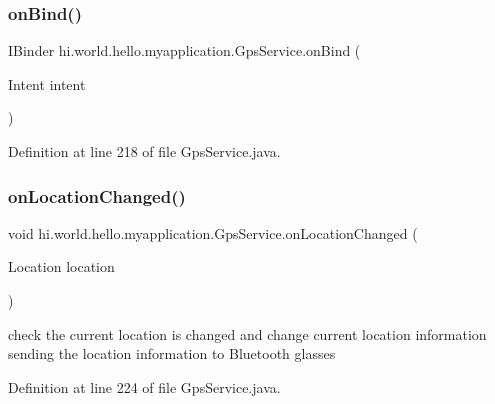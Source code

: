 \subsubsection{\texorpdfstring{onBind()}{onBind()}}
{\footnotesize\ttfamily I\+Binder hi.\+world.\+hello.\+myapplication.\+Gps\+Service.\+on\+Bind (\begin{DoxyParamCaption}\item[{Intent}]{intent }\end{DoxyParamCaption})}



Definition at line 218 of file Gps\+Service.\+java.


\begin{DoxyCode}{0}

\end{DoxyCode}
\mbox{\label{classhi_1_1world_1_1hello_1_1myapplication_1_1_gps_service_aa9ac2f486abbaa257c0dfce7cc2dd678}} 
\subsubsection{\texorpdfstring{onLocationChanged()}{onLocationChanged()}}
{\footnotesize\ttfamily void hi.\+world.\+hello.\+myapplication.\+Gps\+Service.\+on\+Location\+Changed (\begin{DoxyParamCaption}\item[{Location}]{location }\end{DoxyParamCaption})}



check the current location is changed and change current location information sending the location information to Bluetooth glasses 



Definition at line 224 of file Gps\+Service.\+java.


